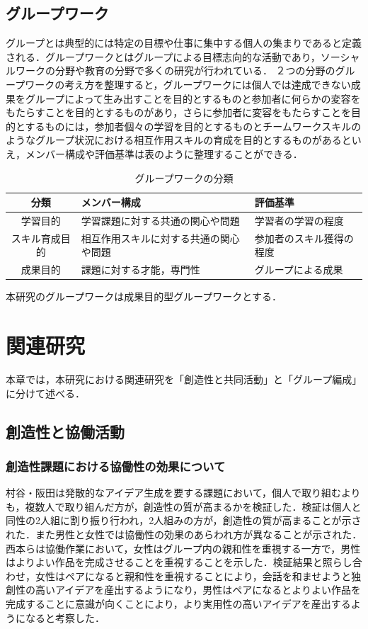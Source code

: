 \documentclass{funthesis}
\begin{document}
\section{グループワーク}
グループとは典型的には特定の目標や仕事に集中する個人の集まりであると定義される．グループワークとはグループによる目標志向的な活動であり，ソーシャルワークの分野や教育の分野で多くの研究が行われている\cite{A13}．
２つの分野のグループワークの考え方を整理すると，グループワークには個人では達成できない成果をグループによって生み出すことを目的とするものと参加者に何らかの変容をもたらすことを目的とするものがあり，さらに参加者に変容をもたらすことを目的とするものには，参加者個々の学習を目的とするものとチームワークスキルのようなグループ状況における相互作用スキルの育成を目的とするものがあるといえ，メンバー構成や評価基準は表のように整理することができる\cite{A13}．
\begin{table}[h]
\begin{center}
  \caption{グループワークの分類}
  \begin{tabular}{|c|p{60mm}|p{43mm}|}\hline
    分類& メンバー構成&評価基準\tabularnewline \hline
    学習目的& 学習課題に対する共通の関心や問題 & 
    学習者の学習の程度\tabularnewline
    スキル育成目的&相互作用スキルに対する共通の関心や問題& 
    参加者のスキル獲得の程度\tabularnewline
    成果目的&課題に対する才能，専門性&
    グループによる成果\tabularnewline
    \hline
  \end{tabular}
  \label{groupwork}
  \end{center}
\end{table}

本研究のグループワークは成果目的型グループワークとする．



\chapter{関連研究}
本章では，本研究における関連研究を「創造性と共同活動」と「グループ編成」に分けて述べる．
\section{創造性と協働活動}

\subsection{創造性課題における協働性の効果について} %
村谷・阪田\cite{A10}は発散的なアイデア生成を要する課題において，個人で取り組むよりも，複数人で取り組んだ方が，創造性の質が高まるかを検証した．検証は個人と同性の2人組に割り振り行われ，2人組みの方が，創造性の質が高まることが示された．また男性と女性では協働性の効果のあらわれ方が異なることが示された．西本ら\cite{A11}は協働作業において，女性はグループ内の親和性を重視する一方で，男性はよりよい作品を完成させることを重視することを示した．検証結果と照らし合わせ，女性はペアになると親和性を重視することにより，会話を和ませようと独創性の高いアイデアを産出するようになり，男性はペアになるとよりよい作品を完成することに意識が向くことにより，より実用性の高いアイデアを産出するようになると考察した．
\end{document}
